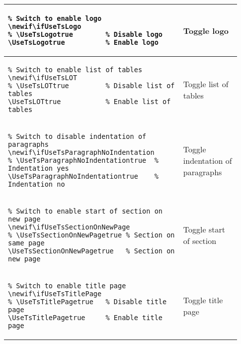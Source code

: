 \begin{footnotesize}
\begin{longtable}{ | P{0.7\linewidth} | p{0.23\linewidth} | }
        \hline
        \begin{BVerbatim}
\newif\ifUseTsLogo
\UseTsLogotrue          %
        \end{BVerbatim}
         & Toggle logo                                                          \\
        \hline
        \begin{BVerbatim}
\newif\ifUseTsLOT
\UseTsLOTtrue           %
        \end{BVerbatim}
         & Toggle list \newline of tables                                       \\
        \hline
        \begin{BVerbatim}
\newif\ifUseTsParagraphNoIndentation
\UseTsParagraphNoIndentationtrue    %
        \end{BVerbatim}
         & Toggle indentation \newline of paragraphs                            \\
        \hline
        \begin{BVerbatim}
\newif\ifUseTsSectionOnNewPage
\UseTsSectionOnNewPagetrue   %
        \end{BVerbatim}
         & Toggle start \newline of section                                     \\
        \hline
        \begin{BVerbatim}
\newif\ifUseTsTitlePage
\UseTsTitlePagetrue     %
        \end{BVerbatim}
         & Toggle title page                                                    \\

\end{longtable}
\end{footnotesize}
